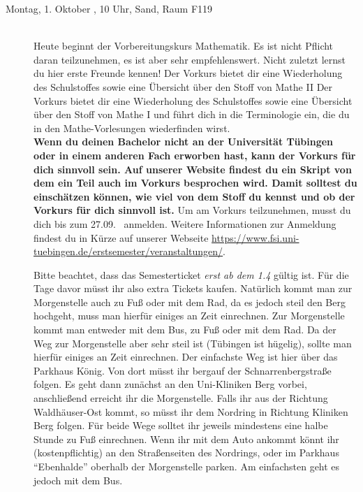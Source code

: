 \begin{description}
	
\item[Montag, 1. Oktober \Jahr, 10 Uhr, Sand, Raum F119]\ \\
Heute beginnt der Vorbereitungskurs Mathematik. Es ist nicht Pflicht daran teilzunehmen, 
es ist aber sehr empfehlenswert. Nicht zuletzt lernst du hier erste Freunde kennen!
\ifsommersemester
Der Vorkurs bietet dir eine Wiederholung des Schulstoffes sowie eine Übersicht über den Stoff von Mathe II 
\fi 
\ifwintersemester
Der Vorkurs bietet dir eine Wiederholung des Schulstoffes sowie eine Übersicht über den Stoff von Mathe I
\fi
und führt dich in die Terminologie ein, die du in den Mathe-Vorlesungen wiederfinden wirst.
\ifmaster
\\
\textbf{Wenn du deinen Bachelor nicht an der Universität Tübingen oder in einem anderen Fach erworben hast, kann der Vorkurs für dich sinnvoll sein. Auf unserer Website findest du ein Skript von dem ein Teil auch im Vorkurs besprochen wird. Damit solltest du einschätzen können, wie viel von dem Stoff du kennst und ob der Vorkurs für dich sinnvoll ist.}
\fi
Um am Vorkurs teilzunehmen, musst du dich bis zum 27.09. \Jahr~anmelden. Weitere Informationen zur Anmeldung findest du in Kürze auf unserer Webseite \url{https://www.fsi.uni-tuebingen.de/erstsemester/veranstaltungen/}.

\ifsommersemester
Bitte beachtet, dass das Semesterticket \emph{erst ab dem 1.4} gültig ist. Für die Tage davor müsst ihr also extra Tickets kaufen. Natürlich kommt man zur Morgenstelle auch zu Fuß oder mit dem Rad, da es jedoch steil den Berg hochgeht, muss man hierfür einiges an Zeit einrechnen.
\fi
Zur Morgenstelle kommt man entweder mit dem Bus, zu Fuß oder mit dem Rad. Da der Weg zur Morgenstelle aber sehr steil ist (Tübingen ist hügelig), sollte man hierfür einiges an Zeit einrechnen.
Der einfachste Weg ist hier über das Parkhaus König. Von dort müsst ihr bergauf der Schnarrenbergstraße folgen. Es geht dann zunächst an den Uni-Kliniken Berg vorbei, anschließend erreicht ihr die Morgenstelle. Falls ihr aus der Richtung Waldh\"auser-Ost kommt, so m\"usst ihr dem Nordring in Richtung Kliniken Berg folgen. Für beide Wege solltet ihr jeweils mindestens eine halbe Stunde zu Fuß einrechnen.
Wenn ihr mit dem Auto ankommt k\"onnt ihr (kostenpflichtig) an den Straßenseiten des Nordrings, oder im Parkhaus "`Ebenhalde"' oberhalb der Morgenstelle parken. Am einfachsten geht es jedoch mit dem Bus.
   

\end{description}
